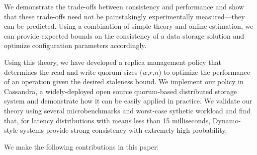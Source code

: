 \documentclass{vldb}
\begin{document}
We demonstrate the trade-offs between consistency and performance and
show that these trade-offs need not be painstakingly experimentally
measured---they can be predicted.  Using a combination of simple
theory and online estimation, we can provide expected bounds on the
consistency of a data storage solution and optimize configuration
parameters accordingly.

Using this theory, we have developed a replica management policy that
determines the read and write quorum sizes ($w$,$r$,$n$) to optimize
the performance of an operation given the desired staleness bound. We
implement our policy in Cassandra, a widely-deployed open source
quorum-based distributed storage system and demonstrate how it can be
easily applied in practice. We validate our theory using several
microbenchmarks and worst-case sythetic workload and find that, for
latency distributions with means less than 15 milliseconds,
Dynamo-style systems provide strong consistency with extremely high
probability.

We make the following contributions in this paper:
\end{document}

